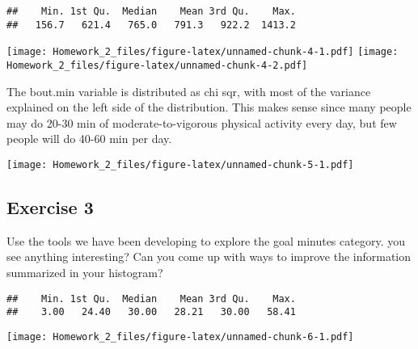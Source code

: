 \documentclass[]{article}
\newenvironment{Shaded}{\begin{snugshade}}{\end{snugshade}}
\newcommand{\KeywordTok}[1]{\textcolor[rgb]{0.13,0.29,0.53}{\textbf{#1}}}
\newcommand{\OperatorTok}[1]{\textcolor[rgb]{0.81,0.36,0.00}{\textbf{#1}}}
\newcommand{\NormalTok}[1]{#1}
\begin{document}
\begin{verbatim}
##    Min. 1st Qu.  Median    Mean 3rd Qu.    Max. 
##   156.7   621.4   765.0   791.3   922.2  1413.2
\end{verbatim}

\texttt{[image: Homework\_2\_files/figure-latex/unnamed-chunk-4-1.pdf]}
\texttt{[image: Homework\_2\_files/figure-latex/unnamed-chunk-4-2.pdf]}

The bout.min variable is distributed as chi sqr, with most of the
variance explained on the left side of the distribution. This makes
sense since many people may do 20-30 min of moderate-to-vigorous
physical activity every day, but few people will do 40-60 min per day.

\texttt{[image: Homework\_2\_files/figure-latex/unnamed-chunk-5-1.pdf]}

\subsection{Exercise 3}\label{exercise-3}

Use the tools we have been developing to explore the goal minutes
category. you see anything interesting? Can you come up with ways to
improve the information summarized in your histogram?

\begin{Shaded}
\end{Shaded}

\begin{verbatim}
##    Min. 1st Qu.  Median    Mean 3rd Qu.    Max. 
##    3.00   24.40   30.00   28.21   30.00   58.41
\end{verbatim}

\begin{Shaded}
\end{Shaded}

\texttt{[image: Homework\_2\_files/figure-latex/unnamed-chunk-6-1.pdf]}

\begin{Shaded}
\end{Shaded}
\end{document}
